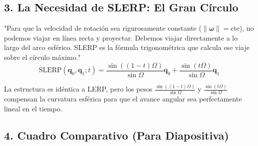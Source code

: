 \documentclass[11pt, a4paper]{article}
\begin{document}
\subsection*{3. La Necesidad de SLERP: El Gran Círculo}
"Para que la velocidad de rotación sea rigurosamente constante ($\left\|\boldsymbol{\omega}\right\| = \text{cte}$), no podemos viajar en línea recta y proyectar. Debemos viajar directamente a lo largo del arco esférico. SLERP es la fórmula trigonométrica que calcula ese viaje sobre el círculo máximo."
\begin{equation}
    \text{SLERP}(\mathbf{q}_0, \mathbf{q}_1; t) = \frac{\sin((1 - t)\Omega)}{\sin\Omega}\mathbf{q}_0 + \frac{\sin(t\Omega)}{\sin\Omega}\mathbf{q}_1
\end{equation}

La estructura es idéntica a LERP, pero los pesos $\frac{\sin((1-t)\Omega)}{\sin\Omega}$ y $\frac{\sin(t\Omega)}{\sin\Omega}$ compensan la curvatura esférica para que el avance angular sea perfectamente lineal en el tiempo.

\subsection*{4. Cuadro Comparativo (Para Diapositiva)}
\begin{table}[h!]
    \centering
    \renewcommand{\arraystretch}{1.5}
\end{table}
\end{document}
